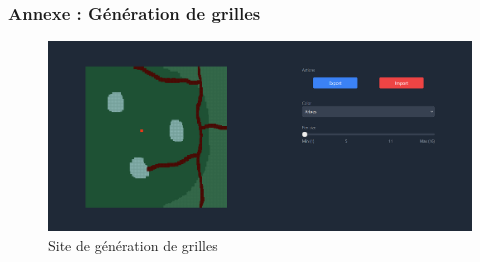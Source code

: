 \documentclass{beamer}
\begin{document}
\begin{frame}
    \frametitle{Annexe : Génération de grilles}
   
    \begin{figure}[!h]
        \begin{minipage}{0.95\textwidth}
          \centering
          \includegraphics[width=1\linewidth]{pictures/website.png}
          \caption{Site de génération de grilles}\label{Fig:Data1}
        \end{minipage}
     \end{figure}
\end{frame}
\end{document}
